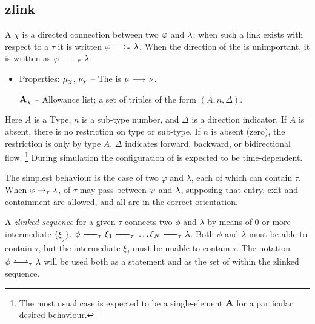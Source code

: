 
\subsection{zlink}
\label{lambdaneigh}

A  $\chi$ is a directed connection between two
 ${\varphi}$ and ${\lambda}$; when such a link
exists with respect to a  $\tau$ it is written
$\varphi {\ \longrightarrow_{\tau}\ } \lambda$.
When the direction of the  is unimportant, it is written as $\varphi {\ -\!\!\!-\!\!\!-_{\tau}\ } \lambda$.

\begin{itemize}
\item Properties:
  ${\mu}_\chi$, ${\nu}_\chi$ -- The  is $\mu {\ \longrightarrow_{}\ } \nu$.
  
  ${\bf A}_\chi$ -- Allowance list; a set of triples of the form
  $(A,n,\Delta)$.
\end{itemize}

Here $A$ is a 
Type, $n$ is a sub-type number, and $\Delta$ is a direction
indicator. If $A$ is absent, there is no restriction on type or
sub-type. If $n$ is absent (zero), the restriction is only by type
$A$. $\Delta$ indicates forward, backward, or bidirectional flow.
\footnote{The most usual case is expected to be a single-element
  ${\bf A}$ for a particular desired  behaviour.}
During simulation the configuration of  is expected to be time-dependent.

The simplest  behaviour is the case of two  $\varphi$ and $\lambda$,
each of which can contain  $\tau$.  When ${\varphi}
\rightarrow_\tau {\lambda}$,  of  $\tau$
may pass between ${\varphi}$ and ${\lambda}$, supposing that
entry, exit and containment are allowed, and all  are in
the correct orientation.

A \emph{zlinked sequence} for a given  $\tau$ connects two  $\phi$ and $\lambda$
by means of 0 or more intermediate  $\{\xi_j\}$.
$\phi \zlink{\tau} \xi_1 \zlink{\tau} \dots \xi_N \zlink{\tau} \lambda$.
Both $\phi$ and $\lambda$ must be able to contain $\tau$,
but the intermediate  $\xi_j$ must be unable to contain $\tau$.
The notation $\phi {\ \leftharpoonup \! \rightharpoonup_{\tau}\ } \lambda$ will be used both as a statement and as the set of 
within the zlinked sequence.

